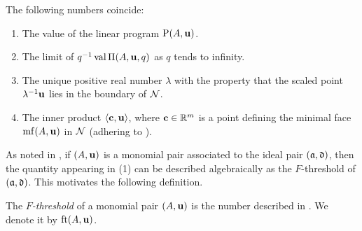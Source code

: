\documentclass[11pt]{amsart}
\begin{document}
\begin{proposition}
   \label{FT descriptions: P}
   The following numbers coincide\textup:
   \begin{enumerate}
      \item\label{value} The value of the linear program $\mathrm{P}(A, \mathbf{u})$.
      \item\label{limit} The limit of $q^{-1}\operatorname{val} \Pi(A,\mathbf{u},q)$ as $q$ tends to infinity.
      \item\label{lambda} The unique positive real number $\lambda$ with the property that the scaled point $\lambda^{-1}\mathbf{u}$ lies in the boundary of $\mathcal{N}$.
      \item\label{new ip} The inner product $\langle \mathbf{c}, \mathbf{u} \rangle$, where $\mathbf{c} \in \mathbb{R}^m$ is a point defining the minimal face $\operatorname{mf}(A, \mathbf{u})$ in $\mathcal{N}$ \textup(adhering to \textup).
   \end{enumerate}
\end{proposition}

As noted in , if $(A,\mathbf{u})$ is a monomial pair associated to the ideal pair $(\mathfrak{a},\mathfrak{d})$, then the quantity appearing in (1) can be described algebraically as the $F$-threshold of $(\mathfrak{a},\mathfrak{d})$.
This motivates the following definition.

\begin{definition}[$F$-threshold]
\label{FT: D}
   The \emph{$F$-threshold} of a monomial pair $(A, \mathbf{u})$ is the number described in .  We denote it by $\operatorname{ft}(A, \mathbf{u})$.
\end{definition}
\end{document}
